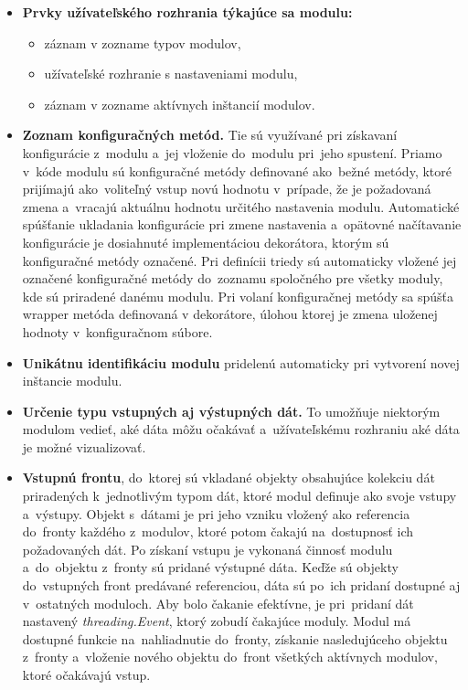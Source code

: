             \begin{itemize}
                \item \textbf{Prvky užívateľského rozhrania týkajúce sa modulu:}
                \begin{itemize}
                    \item záznam v zozname typov modulov,
                    \item užívateľské rozhranie s nastaveniami modulu,
                    \item záznam v zozname aktívnych inštancií modulov.
                \end{itemize}
                \item \textbf{Zoznam konfiguračných metód.} Tie sú využívané pri získavaní konfigurácie z~modulu a~jej vloženie do~modulu pri~jeho spustení. Priamo v~kóde modulu sú konfiguračné metódy definované ako~bežné metódy, ktoré prijímajú ako~voliteľný vstup novú hodnotu v~prípade, že je požadovaná zmena a~vracajú aktuálnu hodnotu určitého nastavenia modulu. Automatické spúšťanie ukladania konfigurácie pri zmene nastavenia a~opätovné načítavanie konfigurácie je dosiahnuté implementáciou dekorátora, ktorým sú konfiguračné metódy označené. Pri definícii triedy sú automaticky vložené jej označené konfiguračné metódy do~zoznamu spoločného pre všetky moduly, kde sú priradené danému modulu. Pri volaní konfiguračnej metódy sa spúšťa wrapper metóda definovaná v dekorátore, úlohou ktorej je zmena uloženej hodnoty v~konfiguračnom súbore.
                \item \textbf{Unikátnu identifikáciu modulu} pridelenú automaticky pri vytvorení novej inštancie modulu.
                \item \textbf{Určenie typu vstupných aj výstupných dát.} To umožňuje niektorým modulom vedieť, aké dáta môžu očakávať a~užívateľskému rozhraniu aké dáta je možné vizualizovať.
                \item \textbf{Vstupnú frontu}, do~ktorej sú vkladané objekty obsahujúce kolekciu dát priradených k~jednotlivým typom dát, ktoré modul definuje ako svoje vstupy a~výstupy. Objekt s~dátami je pri jeho vzniku vložený ako referencia do~fronty každého z~modulov, ktoré potom čakajú na~dostupnosť ich požadovaných dát. Po získaní vstupu je vykonaná činnosť modulu a~do~objektu z~fronty  sú pridané výstupné dáta. Keďže sú objekty do~vstupných front predávané referenciou, dáta sú po~ich pridaní dostupné aj v~ostatných moduloch. Aby bolo čakanie efektívne, je pri~pridaní dát nastavený \emph{threading.Event}, ktorý zobudí čakajúce moduly. Modul má dostupné funkcie na~nahliadnutie do~fronty, získanie nasledujúceho objektu z~fronty a~vloženie nového objektu do~front všetkých aktívnych modulov, ktoré očakávajú vstup.

\end{itemize}
